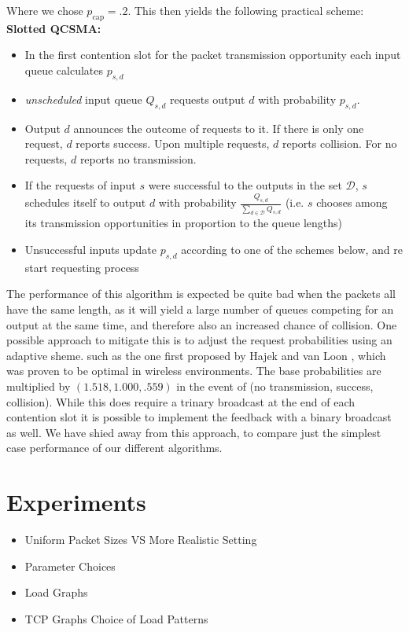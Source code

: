 \documentclass{IEEEtran}%
\begin{document}
Where we chose $p_{\text{cap}}=.2$.  This then yields the following practical scheme:\\

{\bf Slotted QCSMA:}
\begin{itemize}
\item In the first contention slot for the packet transmission opportunity each input queue calculates $p_{s,d}$
\item {\it unscheduled} input queue $Q_{s,d}$ requests output $d$ with probability $p_{s,d}$.
\item Output $d$ announces the outcome of requests to it.  If there is only one request, $d$ reports success.  Upon multiple requests, $d$ reports collision. For no requests, $d$ reports no transmission.
\item If the requests of input $s$ were successful to the outputs in the set $\mathcal{D}$, $s$ schedules itself to output $d$ with probability $\frac{Q_{s,d}}{\sum_{d\in \mathcal{D}}Q_{s,d}}$ (i.e. $s$ chooses among its transmission opportunities in proportion to the queue lengths)
\item Unsuccessful inputs update $p_{s,d}$ according to one of the schemes below, and re start requesting process\\
\end{itemize}

The performance of this algorithm is expected be quite bad when the packets all have the same length, as it will yield a large number of queues competing for an output at the same time, and therefore also an increased chance of collision.  One possible approach to mitigate this is to adjust the request probabilities using an adaptive sheme. such as the one first proposed by Hajek and van Loon \cite{Hajek_van_Loon}, which was proven to be optimal in wireless environments.  The base probabilities are multiplied by $(1.518,1.000,.559)$  in the event of (no transmission, success, collision).  While this does require a trinary broadcast at the end of each contention slot it is possible to implement the feedback with a binary broadcast as well.  We have shied away from this approach, to compare just the simplest case performance of our different algorithms.

\section{Experiments}
\begin{itemize}
\item Uniform Packet Sizes VS More Realistic Setting
\item Parameter Choices
\item Load Graphs
\item TCP Graphs Choice of Load Patterns
\end{itemize}
\end{document}
